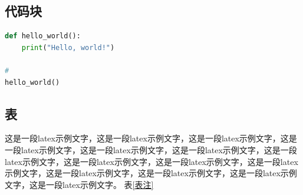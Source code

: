 \documentclass{template} %
\begin{document}
\begin{multicols}{2}

\subsection{代码块}
\begin{lstlisting}[language=Python, caption=示例代码, label=code:example]
def hello_world():
    print("Hello, world!")

# 
hello_world()
\end{lstlisting}

\subsection{表}
这是一段latex示例文字，这是一段latex示例文字，这是一段latex示例文字，这是一段latex示例文字，这是一段latex示例文字，这是一段latex示例文字，这是一段latex示例文字，这是一段latex示例文字，这是一段latex示例文字，这是一段latex示例文字，这是一段latex示例文字，这是一段latex示例文字，这是一段latex示例文字，这是一段latex示例文字。
表\ref{表注}
\begin{table}[H]
  \centering
  \caption{引用名}
  \label{表注}
  \small
\end{table}
    
    
    
    
    \end{multicols}
    
\end{document}
